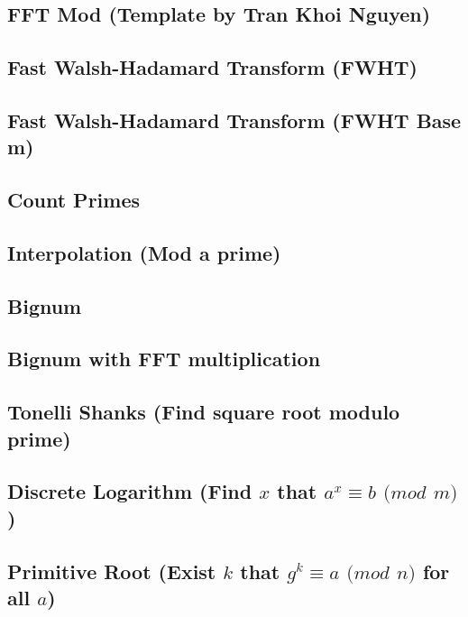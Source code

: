 \subsection{FFT Mod (Template by Tran Khoi Nguyen)}
\raggedbottom
\hrulefill
\subsection{Fast Walsh-Hadamard Transform (FWHT)}
\raggedbottom
\hrulefill
\subsection{Fast Walsh-Hadamard Transform (FWHT Base m)}
\raggedbottom
\hrulefill
\subsection{Count Primes}
\raggedbottom
\hrulefill
\subsection{Interpolation (Mod a prime)}
\raggedbottom
\hrulefill
\subsection{Bignum}
\raggedbottom
\hrulefill
\subsection{Bignum with FFT multiplication}
\raggedbottom
\hrulefill
\subsection{Tonelli Shanks (Find square root modulo prime)}
\raggedbottom
\hrulefill
\subsection{Discrete Logarithm (Find $x$ that $a^x \equiv b$ $(mod$ $m)$)}
\raggedbottom
\hrulefill
\subsection{Primitive Root (Exist $k$ that $g^k \equiv a$ $(mod$ $n)$ for all $a$)}
\raggedbottom
\hrulefill
